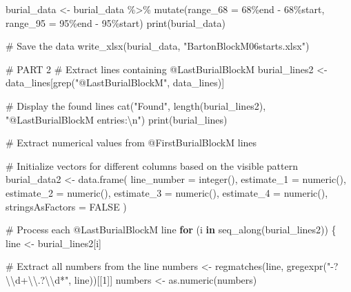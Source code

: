 \documentclass[
]{agujournal2019}
\newenvironment{Shaded}{\begin{snugshade}}{\end{snugshade}}
\newcommand{\AttributeTok}[1]{\textcolor[rgb]{0.40,0.45,0.13}{#1}}
\newcommand{\CommentTok}[1]{\textcolor[rgb]{0.37,0.37,0.37}{#1}}
\newcommand{\ConstantTok}[1]{\textcolor[rgb]{0.56,0.35,0.01}{#1}}
\newcommand{\ControlFlowTok}[1]{\textcolor[rgb]{0.00,0.23,0.31}{\textbf{#1}}}
\newcommand{\DecValTok}[1]{\textcolor[rgb]{0.68,0.00,0.00}{#1}}
\newcommand{\FunctionTok}[1]{\textcolor[rgb]{0.28,0.35,0.67}{#1}}
\newcommand{\NormalTok}[1]{\textcolor[rgb]{0.00,0.23,0.31}{#1}}
\newcommand{\OtherTok}[1]{\textcolor[rgb]{0.00,0.23,0.31}{#1}}
\newcommand{\SpecialCharTok}[1]{\textcolor[rgb]{0.37,0.37,0.37}{#1}}
\newcommand{\StringTok}[1]{\textcolor[rgb]{0.13,0.47,0.30}{#1}}
\begin{document}
\begin{Shaded}
\begin{Highlighting}[]
\NormalTok{burial\_data }\OtherTok{\textless{}{-}}\NormalTok{ burial\_data }\SpecialCharTok{\%\textgreater{}\%}
  \FunctionTok{mutate}\NormalTok{(}\AttributeTok{range\_68 =} \StringTok{\textasciigrave{}}\AttributeTok{68\%end}\StringTok{\textasciigrave{}} \SpecialCharTok{{-}} \StringTok{\textasciigrave{}}\AttributeTok{68\%start}\StringTok{\textasciigrave{}}\NormalTok{,}
         \AttributeTok{range\_95 =} \StringTok{\textasciigrave{}}\AttributeTok{95\%end}\StringTok{\textasciigrave{}} \SpecialCharTok{{-}} \StringTok{\textasciigrave{}}\AttributeTok{95\%start}\StringTok{\textasciigrave{}}\NormalTok{)}
\FunctionTok{print}\NormalTok{(burial\_data)}

\CommentTok{\# Save the data}
\FunctionTok{write\_xlsx}\NormalTok{(burial\_data, }\StringTok{"BartonBlockM06starts.xlsx"}\NormalTok{)}

\CommentTok{\# PART 2}
\CommentTok{\# Extract lines containing @LastBurialBlockM}
\NormalTok{burial\_lines2 }\OtherTok{\textless{}{-}}\NormalTok{ data\_lines[}\FunctionTok{grep}\NormalTok{(}\StringTok{"@LastBurialBlockM"}\NormalTok{, data\_lines)]}

\CommentTok{\# Display the found lines}
\FunctionTok{cat}\NormalTok{(}\StringTok{"Found"}\NormalTok{, }\FunctionTok{length}\NormalTok{(burial\_lines2), }\StringTok{"@LastBurialBlockM entries:}\SpecialCharTok{\textbackslash{}n}\StringTok{"}\NormalTok{)}
\FunctionTok{print}\NormalTok{(burial\_lines)}

\CommentTok{\# Extract numerical values from @FirstBurialBlockM lines}

\CommentTok{\# Initialize vectors for different columns based on the visible pattern}
\NormalTok{burial\_data2 }\OtherTok{\textless{}{-}} \FunctionTok{data.frame}\NormalTok{(}
  \AttributeTok{line\_number =} \FunctionTok{integer}\NormalTok{(),}
  \AttributeTok{estimate\_1 =} \FunctionTok{numeric}\NormalTok{(),}
  \AttributeTok{estimate\_2 =} \FunctionTok{numeric}\NormalTok{(),}
  \AttributeTok{estimate\_3 =} \FunctionTok{numeric}\NormalTok{(),}
  \AttributeTok{estimate\_4 =} \FunctionTok{numeric}\NormalTok{(),}
  \AttributeTok{stringsAsFactors =} \ConstantTok{FALSE}
\NormalTok{)}

\CommentTok{\# Process each @LastBurialBlockM line}
\ControlFlowTok{for}\NormalTok{ (i }\ControlFlowTok{in} \FunctionTok{seq\_along}\NormalTok{(burial\_lines2)) \{}
\NormalTok{  line }\OtherTok{\textless{}{-}}\NormalTok{ burial\_lines2[i]}
  
  \CommentTok{\# Extract all numbers from the line}
\NormalTok{  numbers }\OtherTok{\textless{}{-}} \FunctionTok{regmatches}\NormalTok{(line, }\FunctionTok{gregexpr}\NormalTok{(}\StringTok{"{-}?}\SpecialCharTok{\textbackslash{}\textbackslash{}}\StringTok{d+}\SpecialCharTok{\textbackslash{}\textbackslash{}}\StringTok{.?}\SpecialCharTok{\textbackslash{}\textbackslash{}}\StringTok{d*"}\NormalTok{, line))[[}\DecValTok{1}\NormalTok{]]}
\NormalTok{  numbers }\OtherTok{\textless{}{-}} \FunctionTok{as.numeric}\NormalTok{(numbers)}
  

\end{Highlighting}
\end{Shaded}
\end{document}
